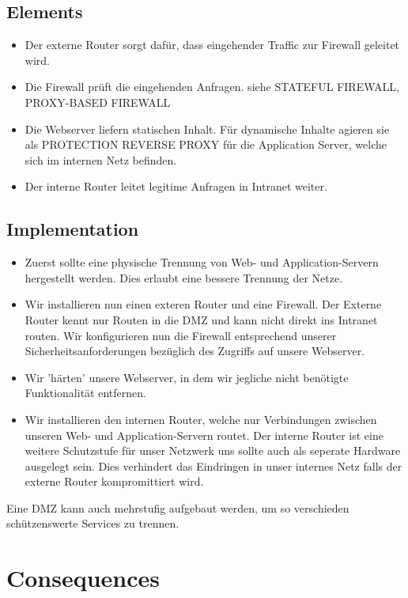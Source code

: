 \subsection{Elements}
\begin{itemize}
  \item Der externe Router sorgt dafür, dass eingehender Traffic zur Firewall geleitet wird.
  \item Die Firewall prüft die eingehenden Anfragen. siehe STATEFUL FIREWALL, PROXY-BASED FIREWALL
  \item Die Webserver liefern statischen Inhalt. Für dynamische Inhalte agieren sie als PROTECTION REVERSE PROXY für die Application Server, welche sich im internen Netz befinden.
  \item Der interne Router leitet legitime Anfragen in Intranet weiter.
\end{itemize}

\subsection{Implementation}
\begin{itemize}
  \item Zuerst sollte eine physische Trennung von Web- und Application-Servern hergestellt werden. Dies erlaubt eine bessere Trennung der Netze.
  \item Wir installieren nun einen exteren Router und eine Firewall. Der Externe Router kennt nur Routen in die DMZ und kann nicht direkt ins Intranet routen. Wir konfigurieren nun die Firewall entsprechend unserer Sicherheitsanforderungen bezüglich des Zugriffs auf unsere Webserver.
  \item Wir 'härten' unsere Webserver, in dem wir jegliche nicht benötigte Funktionalität entfernen.
  \item Wir installieren den internen Router, welche nur Verbindungen zwischen unseren Web- und Application-Servern routet. Der interne Router ist eine weitere Schutzstufe für unser Netzwerk uns sollte auch als seperate Hardware ausgelegt sein. Dies verhindert das Eindringen in unser internes Netz falls der externe Router kompromittiert wird.
\end{itemize}

Eine DMZ kann auch mehrstufig aufgebaut werden, um so verschieden schützenswerte Services zu trennen.

\section{Consequences}
\begin{itemize}
\end{itemize}

